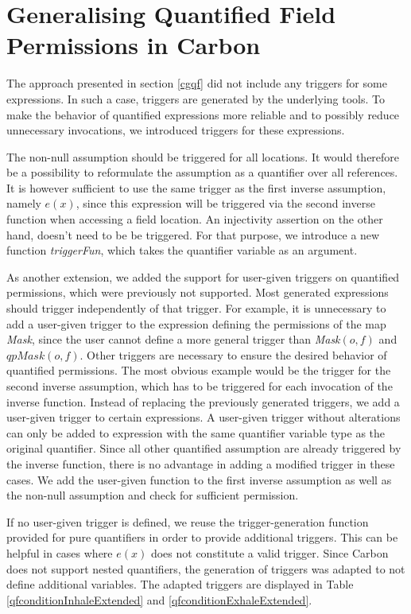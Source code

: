 \documentclass[12pt]{article}
\begin{document}
\section{Generalising Quantified Field Permissions in Carbon}
\label{genField}
The approach presented in section \ref{cgqf} did not include any triggers for some expressions. In such a case, triggers are generated by the underlying tools. To make the behavior of quantified expressions more reliable and to possibly reduce unnecessary invocations, we introduced triggers for these expressions. 

The non-null assumption should be triggered for all locations. It would therefore be a possibility to reformulate the assumption as a quantifier over all references. It is however sufficient to use the same trigger as the first inverse assumption, namely \(e(x)\), since this expression will be triggered via the second inverse function when accessing a field location. An injectivity assertion on the other hand, doesn't need to be be triggered. For that purpose, we introduce a new function \textit{triggerFun}, which takes the quantifier variable as an argument.

As another extension, we added the support for user-given triggers on quantified permissions, which were previously not supported. Most generated expressions should trigger independently of that trigger. For example, it is unnecessary to add a user-given trigger to the expression defining the permissions of the map \textit{Mask}, since the user cannot define a more general trigger than \textit{Mask}\((o , f)\)  and \(qpMask\)\((o , f) \). Other triggers are necessary to ensure the desired behavior of quantified permissions. The most obvious example would be the trigger for the second inverse assumption, which has to be triggered for each invocation of the inverse function. Instead of replacing the previously generated triggers, we add a user-given trigger to certain expressions. A user-given trigger without alterations can only be added to expression with the same quantifier variable type as the original quantifier. Since all other quantified assumption are already triggered by the inverse function, there is no advantage in adding a modified trigger in these cases. We add the user-given function to the first inverse assumption as well as the non-null assumption and check for sufficient permission.

If no user-given trigger is defined, we reuse the trigger-generation function provided for pure quantifiers in order to provide additional triggers. This can be helpful in cases where \(e(x)\) does not constitute a valid trigger. Since Carbon does not support nested quantifiers, the generation of triggers was adapted to not define additional variables. The adapted triggers are displayed in Table \ref{qfconditionInhaleExtended} and \ref{qfconditionExhaleExtended}.
\end{document}
